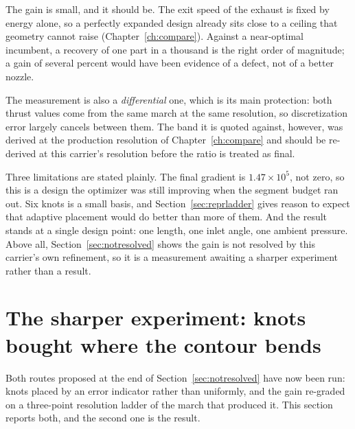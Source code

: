 The gain is small, and it should be. The exit speed of the exhaust is
fixed by energy alone, so a perfectly expanded design already sits
close to a ceiling that geometry cannot raise
(Chapter~\ref{ch:compare}). Against a near-optimal incumbent, a
recovery of one part in a thousand is the right order of magnitude; a
gain of several percent would have been evidence of a defect, not of a
better nozzle.

The measurement is also a \emph{differential} one, which is its main
protection: both thrust values come from the same march at the same
resolution, so discretization error largely cancels between them. The
band it is quoted against, however, was derived at the production
resolution of Chapter~\ref{ch:compare} and should be re-derived at
this carrier's resolution before the ratio is treated as final.

Three limitations are stated plainly. The final gradient is
$1.47\times10^{5}$, not zero, so this is a design the optimizer was
still improving when the segment budget ran out. Six knots is a small
basis, and Section~\ref{sec:reprladder} gives reason to expect that
adaptive placement would do better than more of them. And the result
stands at a single design point: one length, one inlet angle, one
ambient pressure. Above all,
Section~\ref{sec:notresolved} shows the gain is not resolved by this
carrier's own refinement, so it is a measurement awaiting a sharper
experiment rather than a result.

\section{The sharper experiment: knots bought where the contour bends}
\label{sec:adaptive}

Both routes proposed at the end of Section~\ref{sec:notresolved} have
now been run: knots placed by an error indicator rather than
uniformly, and the gain re-graded on a three-point resolution ladder
of the march that produced it. This section reports both, and the
second one is the result.

